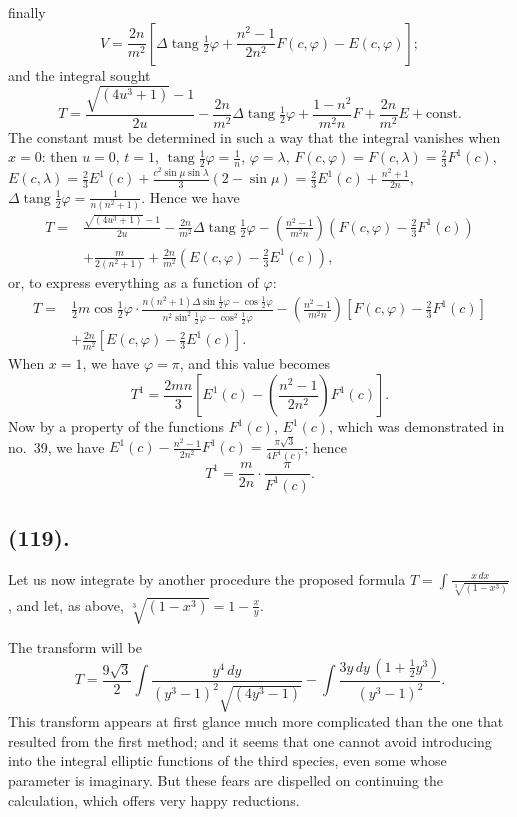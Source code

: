 \documentclass{article}
\begin{document}
finally
\[ V=\frac{2n}{m^{2}}\left[\Delta\operatorname{tang}\tfrac{1}{2}\varphi+\frac{n^{2}-1}{2n^{2}}F(c,\varphi)-E(c,\varphi)\right]; \]
and the integral sought
\[ T=\frac{\sqrt{(4u^{3}+1)}-1}{2u}-\frac{2n}{m^{2}}\Delta\operatorname{tang}\tfrac{1}{2}\varphi+\frac{1-n^{2}}{m^{2}n}F+\frac{2n}{m^{2}}E+\text{const.} \]
The constant must be determined in such a way that the integral vanishes when $x=0$: then $u=0$, $t=1$, $\operatorname{tang}\frac{1}{2}\varphi=\frac{1}{n}$, $\varphi=\lambda$, $F(c,\varphi)=F(c,\lambda)=\frac{2}{3}F^{1}(c)$, $E(c,\lambda)=\frac{2}{3}E^{1}(c)+\frac{c^{2}\sin\mu\sin\lambda}{3}(2-\sin\mu)=\frac{2}{3}E^{1}(c)+\frac{n^{2}+1}{2n}$, $\Delta\operatorname{tang}\frac{1}{2}\varphi=\frac{1}{n(n^{2}+1)}$. Hence we have
\[ \begin{aligned} T={}&\frac{\sqrt{(4u^{3}+1)}-1}{2u}-\frac{2n}{m^{2}}\Delta\operatorname{tang}\tfrac{1}{2}\varphi-\left(\frac{n^{2}-1}{m^{2}n}\right)(F(c,\varphi)-\tfrac{2}{3}F^{1}(c))\\ &+\frac{m}{2(n^{2}+1)}+\frac{2n}{m^{2}}(E(c,\varphi)-\tfrac{2}{3}E^{1}(c)), \end{aligned} \]
or, to express everything as a function of $\varphi$:
\[ \begin{aligned} T={}&\tfrac{1}{2}m\cos\tfrac{1}{2}\varphi\cdot\frac{n(n^{2}+1)\Delta\sin\tfrac{1}{2}\varphi-\cos\tfrac{1}{2}\varphi}{n^{2}\sin^{2}\tfrac{1}{2}\varphi-\cos^{2}\tfrac{1}{2}\varphi}-\left(\frac{n^{2}-1}{m^{2}n}\right)[F(c,\varphi)-\tfrac{2}{3}F^{1}(c)]\\ &+\frac{2n}{m^{2}}[E(c,\varphi)-\tfrac{2}{3}E^{1}(c)]. \end{aligned} \]
When $x=1$, we have $\varphi=\pi$, and this value becomes
\[ T^{1}=\frac{2mn}{3}\left[E^{1}(c)-\left(\frac{n^{2}-1}{2n^{2}}\right)F^{1}(c)\right]. \]
Now by a property of the functions $F^{1}(c)$, $E^{1}(c)$, which was demonstrated in no.\ 39, we have $E^{1}(c)-\frac{n^{2}-1}{2n^{2}}F^{1}(c)=\frac{\pi\sqrt{3}}{4F^{1}(c)}$; hence
\[ T^{1}=\frac{m}{2n}\cdot\frac{\pi}{F^{1}(c)}. \]

\subsection*{(119).}

Let us now integrate by another procedure the proposed formula $T=\displaystyle\int\frac{x\,dx}{\sqrt[3]{(1-x^{3})}}$, and let, as above, $\sqrt[3]{(1-x^{3})}=1-\frac{x}{y}$.

The transform will be
\[ T=\frac{9\sqrt{3}}{2}\int\frac{y^{4}\,dy}{(y^{3}-1)^{2}\sqrt{(4y^{3}-1)}}-\int\frac{3y\,dy\,(1+\tfrac{1}{2}y^{3})}{(y^{3}-1)^{2}}. \]
This transform appears at first glance much more complicated than the one that resulted from the first method; and it seems that one cannot avoid introducing into the integral elliptic functions of the third species, even some whose parameter is imaginary. But these fears are dispelled on continuing the calculation, which offers very happy reductions.
\end{document}
